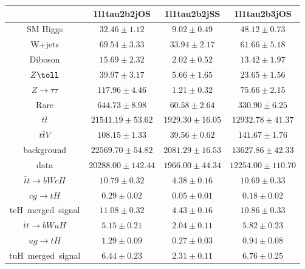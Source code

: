 \centering
\begin{tabular}{|c|c|c|c|} \hline
 & 1l1tau2b2jOS & 1l1tau2b2jSS & 1l1tau2b3jOS\\\hline
SM Higgs & $32.46\pm1.12$ & $9.02\pm0.49$ & $48.12\pm0.73$\\\hline
W+jets & $69.54\pm3.33$ & $33.94\pm2.17$ & $61.66\pm5.18$\\\hline
Diboson & $15.69\pm2.32$ & $2.02\pm0.52$ & $13.42\pm1.97$\\\hline
$Z\toll$ & $39.97\pm3.17$ & $5.66\pm1.65$ & $23.65\pm1.56$\\\hline
$Z\to\tau\tau$ & $117.96\pm4.46$ & $1.21\pm0.32$ & $75.66\pm2.15$\\\hline
Rare & $644.73\pm8.98$ & $60.58\pm2.64$ & $330.90\pm6.25$\\\hline
$t\bar{t}$ & $21541.19\pm53.62$ & $1929.30\pm16.05$ & $12932.78\pm41.37$\\\hline
$t\bar{t}V$ & $108.15\pm1.33$ & $39.56\pm0.62$ & $141.67\pm1.76$\\\hline
background & $22569.70\pm54.82$ & $2081.29\pm16.53$ & $13627.86\pm42.33$\\\hline
data & $20288.00\pm142.44$ & $1966.00\pm44.34$ & $12254.00\pm110.70$\\\hline
$\bar{t}t\to bWcH$ & $10.79\pm0.32$ & $4.38\pm0.16$ & $10.69\pm0.33$\\\hline
$cg\to tH$ & $0.29\pm0.02$ & $0.05\pm0.01$ & $0.18\pm0.02$\\\hline
tcH~merged~signal & $11.08\pm0.32$ & $4.43\pm0.16$ & $10.86\pm0.33$\\\hline
$\bar{t}t\to bWuH$ & $5.15\pm0.21$ & $2.04\pm0.11$ & $5.82\pm0.23$\\\hline
$ug\to tH$ & $1.29\pm0.09$ & $0.27\pm0.03$ & $0.94\pm0.08$\\\hline
tuH~merged~signal & $6.44\pm0.23$ & $2.31\pm0.11$ & $6.76\pm0.25$\\\hline
\end{tabular}
